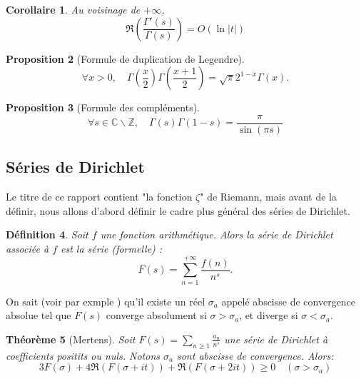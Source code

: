 \documentclass[french]{report}
\newtheorem{theorem}{Théorème}[section]
\newtheorem{definition}[theorem]{Définition}
\newtheorem{proposition}[theorem]{Proposition}
\newtheorem{corollary}[theorem]{Corollaire}
\begin{document}
\begin{corollary}\label{cor:gamma-gamma-prime-majoration}
  Au voisinage de $+\infty$,
  \[
    \Re\left(\frac{\Gamma'(s)}{\Gamma(s)}\right) = O(\ln|t|)
  \]
\end{corollary}

\begin{proposition}[Formule de duplication de Legendre]\label{prop:gamma-duplication-legendre}
  \[
    \forall x>0,\quad
    \Gamma\left(\frac{x}{2}\right)\Gamma\left(\frac{x+1}{2}\right)
    =\sqrt{\pi}2^{1-x}\Gamma(x).
  \]
\end{proposition}

\begin{proposition}[Formule des compléments]\label{prop:gamma-formule-complements}
  \[
    \forall s\in\mathbb{C}\backslash\mathbb{Z},\quad
    \Gamma(s)\Gamma(1-s)=\frac{\pi}{\sin(\pi s)}
  \]
\end{proposition}

\subsection{Séries de Dirichlet}

Le titre de ce rapport contient "la fonction $\zeta$" de Riemann, mais avant de la définir, nous allons d'abord définir le cadre plus général des séries de Dirichlet.

\begin{definition}\label{def:serie-dirichlet}
  Soit $f$ une fonction arithmétique. Alors la série de Dirichlet associée à $f$ est la série (formelle) :
  \[ F(s) = \sum_{n=1}^{+\infty}\frac{f(n)}{n^s}. \]
\end{definition}

On sait (voir par exmple \cite{hindry}) qu'il existe un réel $\sigma_a$ appelé abscisse de convergence absolue tel que $F(s)$ converge absolument si $\sigma>\sigma_a$, et diverge si $\sigma<\sigma_a$.

\begin{theorem}[Mertens]\label{thm:mertens-positif}
  Soit $F(s) =\sum_{n\geq1}\frac{a_n}{n^s}$ une série de Dirichlet à coefficients positits ou nuls. Notons $\sigma_a$ sont abscisse de convergence. Alors:
  \[ 3F(\sigma)+4\Re(F(\sigma+it))+\Re(F(\sigma+2it))\geq0 \quad(\sigma>\sigma_a) \]
\end{theorem}
\end{document}
